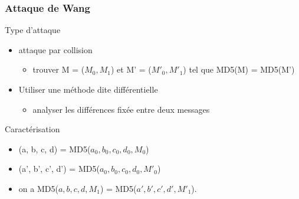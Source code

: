 \begin{frame}
		\frametitle{Attaque de Wang}		
		\begin{block}{Type d'attaque}
		\begin{itemize}
		\item attaque par collision
		  \begin{itemize}
		  \item trouver M = ($M_0, M_1$) et M' = ($M'_0, M'_1$) tel que MD5(M) = MD5(M')
		  \end{itemize}
		\item Utiliser une m\'ethode dite diff\'erentielle
		 \begin{itemize}
		 \item analyser les diff\'erences fix\'ee entre deux messages 
		 \end{itemize}
		\end{itemize}
		\end{block}
		
		\begin{block}{Caract\'erisation}
		\begin{itemize}
		\item (a, b, c, d) = MD5($a_0, b_0, c_0, d_0, M_0$)
		\item (a', b', c', d') = MD5($a_0, b_0, c_0, d_0, M'_0$)
		\item on a MD5($a, b, c, d, M_1$) = MD5($a', b', c', d', M'_1$).
\end{itemize}
		\end{block}
	\end{frame}

